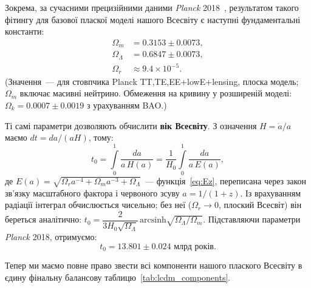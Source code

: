 Зокрема, за сучасними прецизійними даними \textit{Planck} 2018~\cite{planck_2018}, результатом такого фітингу для базової пласкої моделі нашого Всесвіту є наступні фундаментальні константи:
\begin{equation}\label{eq:LCDM_params}
\begin{split}
    \Omega_m &= 0.3153 \pm 0.0073,        \\
    \Omega_\Lambda &= 0.6847 \pm 0.0073,  \\
    \Omega_r &\approx 9.4 \times 10^{-5}.
\end{split}
\end{equation}
(Значення~--- для стовпчика Planck TT,TE,EE+lowE+lensing, плоска модель; $\Omega_m$ включає масивні нейтрино. Обмеження на кривину у розширеній моделі: $\Omega_k = 0.0007 \pm 0.0019$ з урахуванням BAO.)

Ті самі параметри дозволяють обчислити \textbf{вік Всесвіту}. З означення $H=\dot a/a$ маємо $dt = da/(aH)$, тому:
\begin{equation}\label{eq:age}
  t_0 = \int\limits_0^1 \frac{da}{a\,H(a)} = \frac{1}{H_0}\int\limits_0^1 \frac{da}{a\,E(a)},
\end{equation}
де $E(a) = \sqrt{\Omega_r a^{-4} + \Omega_m a^{-3} + \Omega_\Lambda}$~--- функція~\eqref{eq:Ez}, переписана через закон зв'язку масштабного фактора і червоного зсуву $a = 1/(1+z)$. Із врахуванням радіації інтеграл обчислюється чисельно; без неї ($\Omega_r\to0$, плоский Всесвіт) він береться аналітично:
$t_0 = \dfrac{2}{3H_0\sqrt{\Omega_\Lambda}}\,\mathrm{arcsinh}\sqrt{\Omega_\Lambda/\Omega_m}$.
Підставляючи параметри \textit{Planck} 2018, отримуємо:
\begin{equation*}
  t_0 = 13.801 \pm 0.024 \text{ млрд років.}
\end{equation*}

Тепер ми маємо повне право звести всі компоненти нашого плаского Всесвіту в єдину фінальну балансову таблицю~\ref{tab:lcdm_components}.


